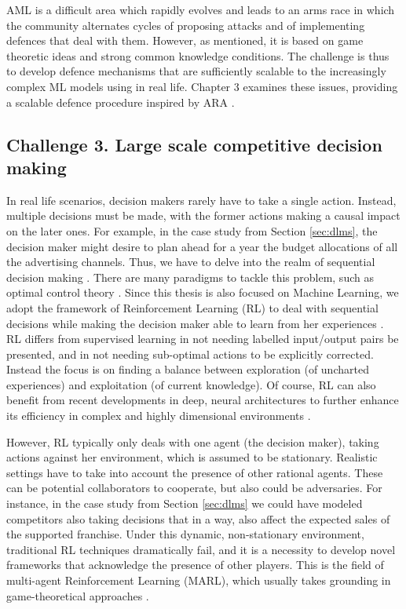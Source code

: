 AML is a  difficult area which rapidly evolves and leads to an 
arms race in which the community alternates cycles of proposing attacks and  of implementing defences that deal with them. However, as mentioned, it is 
based on game theoretic ideas and strong common
knowledge conditions. The challenge is thus to develop defence mechanisms that are sufficiently scalable to the increasingly complex ML models using in real life.
Chapter 3 examines these issues, providing a scalable defence procedure inspired by ARA \parencite{rios2009adversarial,banks2015adversarial}.





\subsection{Challenge 3. Large scale competitive decision making}

In real life scenarios, decision makers rarely have to take a single action. Instead, multiple decisions must be made, with the former actions making a causal impact on the later ones. For example, in the case study from Section \ref{sec:dlms}, the decision maker might desire to plan ahead for a year the budget allocations of all the advertising channels. Thus, we have to delve into the realm of sequential decision making \parencite{french,DIEDERICH200113917}. There are many paradigms to tackle this problem, such as optimal control theory \parencite{kirk2004optimal}. Since this thesis is also focused on Machine Learning, we adopt the framework of Reinforcement Learning (RL) to deal with sequential decisions while making the decision maker able to learn from her experiences \parencite{sutton2012reinforcement,kaelbling1996reinforcement}. RL differs from supervised learning in not needing labelled input/output pairs be presented, and in not needing sub-optimal actions to be explicitly corrected. Instead the focus is on finding a balance between exploration (of uncharted experiences) and exploitation (of current knowledge). Of course, RL can also benefit from recent developments in deep, neural architectures to further enhance its efficiency in complex and highly dimensional environments \parencite{mnih2015human}.

However, RL typically only deals with one agent (the decision maker), taking actions against her environment, which is assumed to be stationary. Realistic settings have to take into account the presence of other rational agents. These can be potential collaborators to cooperate, but also could be adversaries. For instance, in the case study from Section \ref{sec:dlms} we could have modeled competitors also taking decisions that in a way, also affect the expected sales of the supported franchise. Under this dynamic, non-stationary environment, traditional RL techniques dramatically fail, and it is a necessity to develop novel frameworks that acknowledge the presence of other players. This is the field of multi-agent Reinforcement Learning (MARL), which usually takes grounding in game-theoretical approaches \parencite{marl_over,lanctot2017unified}. 

